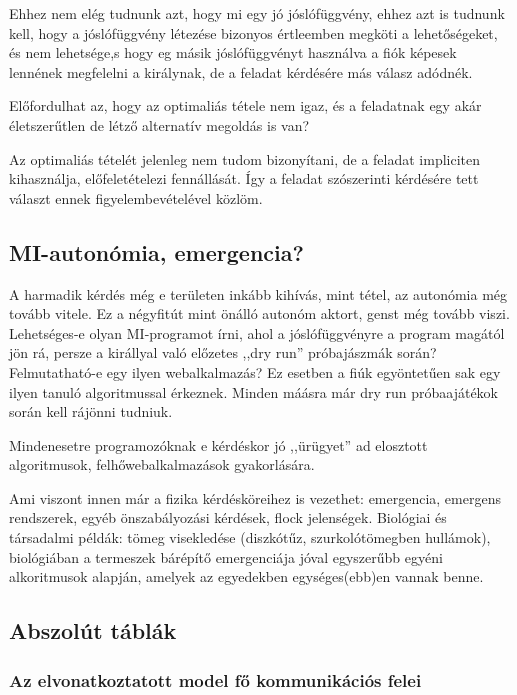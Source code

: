 \documentclass{article}
\begin{document}
	Ehhez nem elég tudnunk azt, hogy mi egy jó jóslófüggvény, ehhez azt is tudnunk kell, hogy a jóslófüggvény létezése bizonyos értleemben megköti a lehetőségeket, és nem lehetsége,s hogy eg másik jóslófüggvényt használva a fiók képesek lennének megfelelni a királynak, de a feladat kérdésére más válasz adódnék.

	Előfordulhat az, hogy az optimaliás tétele nem igaz, és a feladatnak egy akár életszerűtlen de létző alternatív megoldás is van?

	Az optimaliás tételét jelenleg nem tudom bizonyítani, de a feladat impliciten kihasználja, előfeletételezi fennállását. Így a feladat szószerinti kérdésére tett választ ennek figyelembevételével közlöm.

	\subsection{MI-autonómia, emergencia?}

	A harmadik kérdés még e területen inkább kihívás, mint tétel, az autonómia még tovább vitele. Ez a négyfitút mint önálló autonóm aktort, genst még tovább viszi. Lehetséges-e olyan MI-programot írni, ahol a jóslófüggvényre a program magától jön rá, persze a királlyal való előzetes ,,dry run'' próbajászmák során? Felmutatható-e egy ilyen webalkalmazás? Ez esetben a fiúk egyöntetűen sak egy ilyen tanuló algoritmussal érkeznek. Minden máásra már dry run próbaajátékok során kell rájönni tudniuk.

	Mindenesetre programozóknak e kérdéskor jó ,,ürügyet'' ad elosztott algoritmusok, felhőwebalkalmazások gyakorlására.

	Ami viszont innen már a fizika kérdésköreihez is vezethet: emergencia, emergens rendszerek, egyéb önszabályozási kérdések, flock jelenségek. Biológiai és társadalmi példák: tömeg visekledése (diszkótűz, szurkolótömegben hullámok), biológiában a termeszek bárépítő emergenciája jóval egyszerűbb egyéni alkoritmusok alapján, amelyek az egyedekben egységes(ebb)en vannak benne.

	\subsection{Abszolút táblák}

	\subsubsection{Az elvonatkoztatott model fő kommunikációs felei}
\end{document}
